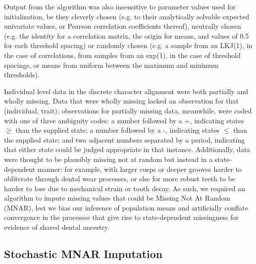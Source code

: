 \documentclass[10pt, twocolumn, twoside]{article}
\begin{document}
Output from the algorithm was also insensitive to parameter values used for initialization, be they cleverly chosen (e.g. to their analytically solvable expected univariate values, or Pearson correlation coefficients thereof), neutrally chosen (e.g. the identity for a correlation matrix, the origin for means, and values of 0.5 for each threshold spacing) or randomly chosen (e.g. a sample from an LKJ(1), in the case of correlations, from samples from an exp(1), in the case of threshold spacings, or means from uniform between the maximum and minimum thresholds). 

Individual level data in the discrete character alignment were both partially and wholly missing. Data that were wholly missing lacked an observation for that (individual, trait); observations for partially missing data, meanwhile, were coded with one of three ambiguity codes: a number followed by a +, indicating states $\geq$ than the supplied state; a number followed by a -, indicating states $\leq$ than the supplied state; and two adjacent numbers separated by a period, indicating that either state could be judged appropriate in that instance. Additionally, data were thought to be plausibly missing not at random but instead in a state-dependent manner: for example, with larger cusps or deeper grooves harder to obliterate through dental wear processes, or else for more robust teeth to be harder to lose due to mechanical strain or tooth decay. As such, we required an algorithm to impute missing values that could be Missing Not At Random (MNAR), lest we bias our inference of population means and artificially conflate convergence in the processes that give rise to state-dependent missingness for evidence of shared dental ancestry.

\subsection{Stochastic MNAR Imputation}
\end{document}
